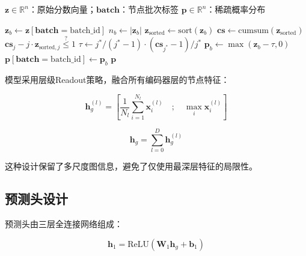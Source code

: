 \begin{algorithm}
  \centering
  \caption{Sparsemax归一化算法}
  \label{alg:sparsemax}
  \small
  \begin{algorithmic}[1]
  \REQUIRE $\mathbf{z} \in \mathbb{R}^n$：原始分数向量；$\mathbf{batch}$：节点批次标签
  \ENSURE $\mathbf{p} \in \mathbb{R}^n$：稀疏概率分布

  \STATE {}
    \STATE $\mathbf{z}_b \leftarrow \mathbf{z}[\mathbf{batch} = \text{batch\_id}]$
    \STATE $n_b \leftarrow |\mathbf{z}_b|$
    \STATE {}
    \STATE $\mathbf{z}_{\text{sorted}} \leftarrow \text{sort}(\mathbf{z}_b)$
    \STATE $\mathbf{cs} \leftarrow \text{cumsum}(\mathbf{z}_{\text{sorted}})$
    \STATE {}
      \STATE $\mathbf{cs}_j - j \cdot \mathbf{z}_{\text{sorted},j} \overset{?}{\leq} 1$
    \ENDFOR
    \STATE $\tau \leftarrow j^* / (j^* - 1) \cdot (\mathbf{cs}_{j^*} - 1) / j^*$
    \STATE {}
    \STATE $\mathbf{p}_b \leftarrow \max(\mathbf{z}_b - \tau, 0)$
    \STATE $\mathbf{p}[\mathbf{batch} = \text{batch\_id}] \leftarrow \mathbf{p}_b$
  \ENDFOR
  \RETURN $\mathbf{p}$
  \end{algorithmic}
\end{algorithm}

\newpage

模型采用层级Readout策略，融合所有编码器层的节点特征：

\begin{equation}
\mathbf{h}_g^{(l)} = \left[ \frac{1}{N_l} \sum_{i=1}^{N_l} \mathbf{x}^{(l)}_i \quad ; \quad \max_{i} \mathbf{x}^{(l)}_i \right]
\end{equation}

\begin{equation}
\mathbf{h}_g = \sum_{l=0}^{D} \mathbf{h}_g^{(l)}
\end{equation}

这种设计保留了多尺度图信息，避免了仅使用最深层特征的局限性。

\subsection{预测头设计}

预测头由三层全连接网络组成：

\begin{equation}
\mathbf{h}_1 = \text{ReLU}\left( \mathbf{W}_1 \mathbf{h}_g + \mathbf{b}_1 \right)
\end{equation}

